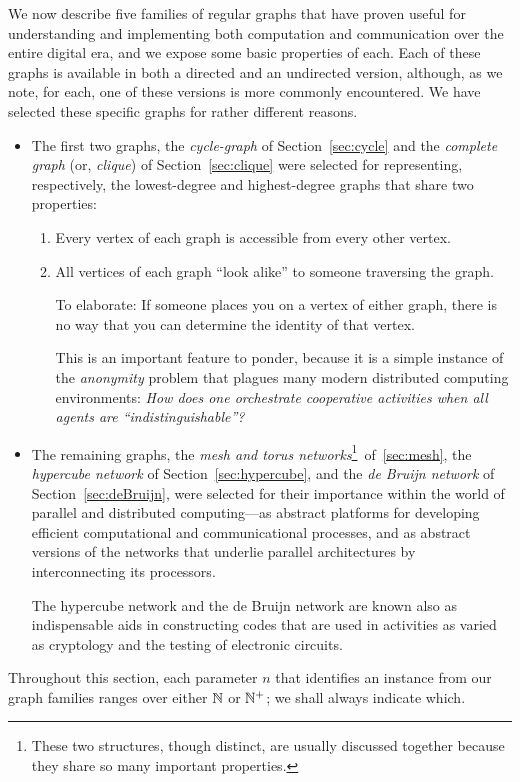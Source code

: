 We now describe five families of regular graphs that have proven useful for understanding and implementing both computation and communication over the entire digital era, and we expose some basic properties of each.  Each of these graphs is available in both a directed and an undirected version, although, as we note, for each, one of these versions is more commonly encountered.  We have selected these specific graphs for rather different reasons.
\begin{itemize}
\item
The first two graphs, the {\it cycle-graph} of Section~\ref{sec:cycle} and the {\it complete graph} (or, {\it clique}) of Section~\ref{sec:clique} were selected for representing, respectively, the lowest-degree and highest-degree graphs that share two properties:
\begin{enumerate}
\item
Every vertex of each graph is accessible from every other vertex.
\medskip\item
All vertices of each graph ``look alike'' to someone traversing the graph.

\smallskip

To elaborate: If someone places you on a vertex of either graph, there is no way that you can determine the identity of that vertex.

\smallskip


This is an important feature to ponder, because it is a simple instance of the {\it anonymity} problem that plagues many modern distributed computing environments:  {\it How does one orchestrate cooperative activities when all agents are ``indistinguishable''?}
\end{enumerate}
\medskip\item
The remaining graphs, the {\it mesh and torus networks}\footnote{These two structures, though distinct, are usually discussed together because they share so many important properties.}~of~\ref{sec:mesh}, the {\it hypercube network} of Section~\ref{sec:hypercube}, and the {\it de Bruijn network} of Section~\ref{sec:deBruijn}, were selected for their importance within the world of parallel and distributed computing---as abstract platforms for developing efficient computational and communicational processes, and as abstract versions of the networks that underlie parallel architectures by interconnecting its processors.

\smallskip

The hypercube network and the de Bruijn network are known also as indispensable aids in constructing codes that are used in activities as varied as cryptology and the testing of electronic circuits.
\end{itemize}
Throughout this section, each parameter $n$ that identifies an instance from our graph families ranges over either $\mathbb{N}$ or $\mathbb{N}^+$; we shall always indicate which.

